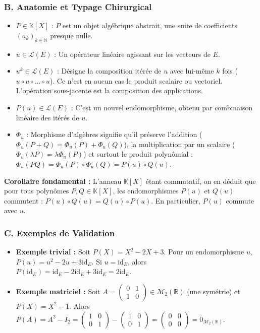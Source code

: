 \documentclass[11pt,a4paper]{article}
\begin{document}
\subsubsection{B. Anatomie et Typage Chirurgical}
\begin{itemize}
\item $P \in \mathbb{K}[X]$ : $P$ est un objet algébrique abstrait, une suite de coefficients $(a_k)_{k \in \mathbb{N}}$ presque nulle.
\item $u \in \mathcal{L}(E)$ : Un opérateur linéaire agissant sur les vecteurs de $E$.
\item $u^k \in \mathcal{L}(E)$ : Désigne la composition itérée de $u$ avec lui-même $k$ fois ($u \circ u \circ \dots \circ u$). Ce n'est en aucun cas le produit scalaire ou vectoriel. L'opération sous-jacente est la composition des applications.
\item $P(u) \in \mathcal{L}(E)$ : C'est un nouvel endomorphisme, obtenu par combinaison linéaire des itérés de $u$.
\item $\Phi_u$ : Morphisme d'algèbres signifie qu'il préserve l'addition ($\Phi_u(P+Q) = \Phi_u(P) + \Phi_u(Q)$), la multiplication par un scalaire ($\Phi_u(\lambda P) = \lambda \Phi_u(P)$) et surtout le produit polynômial : $\Phi_u(PQ) = \Phi_u(P) \circ \Phi_u(Q) = P(u) \circ Q(u)$.
\end{itemize}

\textbf{Corollaire fondamental :} L'anneau $\mathbb{K}[X]$ étant commutatif, on en déduit que pour tous polynômes $P, Q \in \mathbb{K}[X]$, les endomorphismes $P(u)$ et $Q(u)$ commutent : $P(u) \circ Q(u) = Q(u) \circ P(u)$. En particulier, $P(u)$ commute avec $u$.

\subsubsection{C. Exemples de Validation}
\begin{itemize}
\item \textbf{Exemple trivial :} Soit $P(X) = X^2 - 2X + 3$. Pour un endomorphisme $u$, $P(u) = u^2 - 2u + 3\text{id}_E$. Si $u = \text{id}_E$, alors $P(\text{id}_E) = \text{id}_E - 2\text{id}_E + 3\text{id}_E = 2\text{id}_E$.
\item \textbf{Exemple matriciel :} Soit $A = \begin{pmatrix} 0 & 1 \\ 1 & 0 \end{pmatrix} \in \mathcal{M}_2(\mathbb{R})$ (une symétrie) et $P(X) = X^2 - 1$. Alors $P(A) = A^2 - I_2 = \begin{pmatrix} 1 & 0 \\ 0 & 1 \end{pmatrix} - \begin{pmatrix} 1 & 0 \\ 0 & 1 \end{pmatrix} = \begin{pmatrix} 0 & 0 \\ 0 & 0 \end{pmatrix} = 0_{\mathcal{M}_2(\mathbb{R})}$.
\end{itemize}
\end{document}
